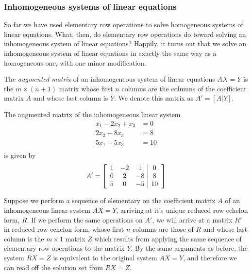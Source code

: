 \documentclass[12pt,letterpaper,reqno]{article}
\numberwithin{equation}{section}
\newcommand{\ti}[1]{\textit{#1}}
\begin{document}
\subsubsection{Inhomogeneous systems of linear equations}
So far we have used elementary row operations to solve homogeneous systems of linear equations. What, then, do elementary row operations do toward solving an inhomogeneous system of linear equations? Happily, it turns out that we solve an inhomogeneous system of linear equations in exactly the same way as a homogeneous one, with one minor modification.

\begin{defn}\label{def:augmented_matrix}
The \ti{augmented matrix} of an inhomogeneous system of linear equations $AX=Y$ is the $m \times (n+1)$ matrix whose first $n$ columns are the columns of the coefficient matrix $A$ and whose last column is $Y$. We denote this matrix as $A'=[A|Y]$.
\end{defn}

\begin{example}\label{ex:augmented}
The augmented matrix of the inhomogeneous linear system
\begin{equation}\label{eq:inhom_system_example}
\begin{split}
	x_1-2x_2+x_3&=0 \\
	2x_2-8x_3&=8 \\
	5x_1-5x_3&=10 \\
\end{split}
\end{equation}
is given by
\begin{align*}
	A'=\left[\begin{array}{c c c | c}
		1&-2&1&0 \\
		0&2&-8&8 \\
		5&0&-5&10
	\end{array}\right]
\end{align*}	
\end{example}


Suppose we perform a sequence of elementary on the coefficient matrix $A$ of an inhomogeneous linear system $AX=Y$, arriving at it's unique reduced row echelon form, $R$. If we perform the same operations on $A'$, we will arrive at a matrix $R'$ in reduced row echelon form, whose first $n$ columns are those of $R$ and whose last column is the $m \times 1$ matrix $Z$ which results from applying the same sequence of elementary row operations to the matrix $Y$. By the same arguments as before, the system $RX=Z$ is equivalent to the original system $AX=Y$, and therefore we can read off the solution set from $RX=Z$.
\end{document}
